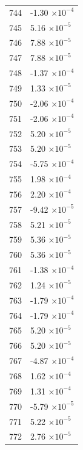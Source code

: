 \documentclass[a4paper,11pt]{article}
\begin{document}
\begin{center}
\begin{longtable}{|R{1.5cm}|R{2.5cm}|}
  744 &        -1.30 $\times 10^{          -4}$ \\
  745 &         5.16 $\times 10^{          -5}$ \\
  746 &         7.88 $\times 10^{          -5}$ \\
  747 &         7.88 $\times 10^{          -5}$ \\
  748 &        -1.37 $\times 10^{          -4}$ \\
  749 &         1.33 $\times 10^{          -5}$ \\
  750 &        -2.06 $\times 10^{          -4}$ \\
  751 &        -2.06 $\times 10^{          -4}$ \\
  752 &         5.20 $\times 10^{          -5}$ \\
  753 &         5.20 $\times 10^{          -5}$ \\
  754 &        -5.75 $\times 10^{          -4}$ \\
  755 &         1.98 $\times 10^{          -4}$ \\
  756 &         2.20 $\times 10^{          -4}$ \\
  757 &        -9.42 $\times 10^{          -5}$ \\
  758 &         5.21 $\times 10^{          -5}$ \\
  759 &         5.36 $\times 10^{          -5}$ \\
  760 &         5.36 $\times 10^{          -5}$ \\
  761 &        -1.38 $\times 10^{          -4}$ \\
  762 &         1.24 $\times 10^{          -5}$ \\
  763 &        -1.79 $\times 10^{          -4}$ \\
  764 &        -1.79 $\times 10^{          -4}$ \\
  765 &         5.20 $\times 10^{          -5}$ \\
  766 &         5.20 $\times 10^{          -5}$ \\
  767 &        -4.87 $\times 10^{          -4}$ \\
  768 &         1.62 $\times 10^{          -4}$ \\
  769 &         1.31 $\times 10^{          -4}$ \\
  770 &        -5.79 $\times 10^{          -5}$ \\
  771 &         5.22 $\times 10^{          -5}$ \\
  772 &         2.76 $\times 10^{          -5}$ \\

\end{longtable}
\end{center}
\end{document}
